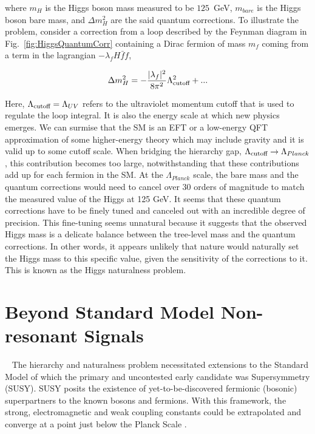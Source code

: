 where $m_H$ is the Higgs boson mass measured to be $125$~GeV, $m_{bare}$ is the Higgs boson bare mass, and $\Delta m^2_{H}$ are the said quantum corrections. To illustrate the problem, consider a correction from a loop described by the Feynman diagram in Fig.~\ref{fig:HiggsQuantumCorr} containing a Dirac fermion of mass $m_f$ coming from a term in the lagrangian $-\lambda_fH\bar{f}f$, 

\begin{equation}
    \label{eq:HiggsMass}
    \Delta m^2_{H} = - \frac{|\lambda_f|^2}{8\pi^2} \Lambda^2_{\textnormal{cutoff}} + ...
\end{equation}

Here, $\Lambda_{\textnormal{cutoff}} = \Lambda_{UV}$ refers to the ultraviolet momentum cutoff that is used to regulate the loop integral. It is also the energy scale at which new physics emerges. We can surmise that the SM is an EFT or a low-energy QFT approximation of some higher-energy theory which may include gravity and it is valid up to some cutoff scale. When bridging the hierarchy gap, $\Lambda_{\textnormal{cutoff}} \rightarrow \Lambda_{Planck}$, this contribution becomes too large, notwithstanding that these contributions add up for each fermion in the SM. At the $\Lambda_{Planck}$ scale, the bare mass and the quantum corrections would need to cancel over 30 orders of magnitude to match the measured value of the Higgs at 125 GeV. It seems that these quantum corrections have to be finely tuned and canceled out with an incredible degree of precision. This fine-tuning seems unnatural because it suggests that the observed Higgs mass is a delicate balance between the tree-level mass and the quantum corrections. In other words, it appears unlikely that nature would naturally set the Higgs mass to this specific value, given the sensitivity of the corrections to it. This is known as the Higgs naturalness problem.

\section{Beyond Standard Model Non-resonant Signals}~\label{sec:BSMNonReso}
The hierarchy and naturalness problem necessitated extensions to the Standard Model of which the primary and uncontested early candidate was Supersymmetry (SUSY). SUSY posits the existence of yet-to-be-discovered fermionic (bosonic) superpartners to the known bosons and fermions. With this framework, the strong, electromagnetic and weak coupling constants could be extrapolated and converge at a point just below the Planck Scale \cite{Martin:1997ns}.

